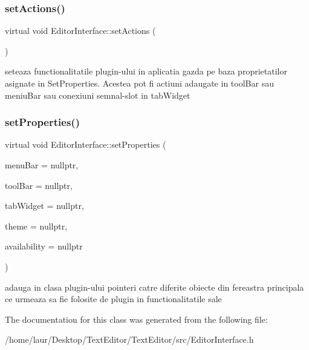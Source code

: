 \subsubsection{\texorpdfstring{set\+Actions()}{setActions()}}
{\footnotesize\ttfamily virtual void Editor\+Interface\+::set\+Actions (\begin{DoxyParamCaption}{ }\end{DoxyParamCaption})\hspace{0.3cm}{\ttfamily [pure virtual]}}

seteaza functionalitatile plugin-\/ului in aplicatia gazda pe baza proprietatilor asignate in Set\+Properties. Acestea pot fi actiuni adaugate in tool\+Bar sau meniu\+Bar sau conexiuni semnal-\/slot in tab\+Widget \mbox{\label{class_editor_interface_ae05ad16a2fec202fbc24c2111b163287}} 
\subsubsection{\texorpdfstring{set\+Properties()}{setProperties()}}
{\footnotesize\ttfamily virtual void Editor\+Interface\+::set\+Properties (\begin{DoxyParamCaption}\item[{Q\+Menu\+Bar $\ast$}]{menu\+Bar = {\ttfamily nullptr},  }\item[{Q\+Tool\+Bar $\ast$}]{tool\+Bar = {\ttfamily nullptr},  }\item[{\hyperlink{class_tab_widget}{Tab\+Widget} $\ast$}]{tab\+Widget = {\ttfamily nullptr},  }\item[{\hyperlink{class_theme}{Theme} $\ast$}]{theme = {\ttfamily nullptr},  }\item[{\hyperlink{class_availability}{Availability} $\ast$}]{availability = {\ttfamily nullptr} }\end{DoxyParamCaption})\hspace{0.3cm}{\ttfamily [pure virtual]}}

adauga in clasa plugin-\/ului pointeri catre diferite obiecte din fereastra principala ce urmeaza sa fie folosite de plugin in functionalitatile sale 

The documentation for this class was generated from the following file\+:\begin{DoxyCompactItemize}
\item 
/home/laur/\+Desktop/\+Text\+Editor/\+Text\+Editor/src/Editor\+Interface.\+h\end{DoxyCompactItemize}
